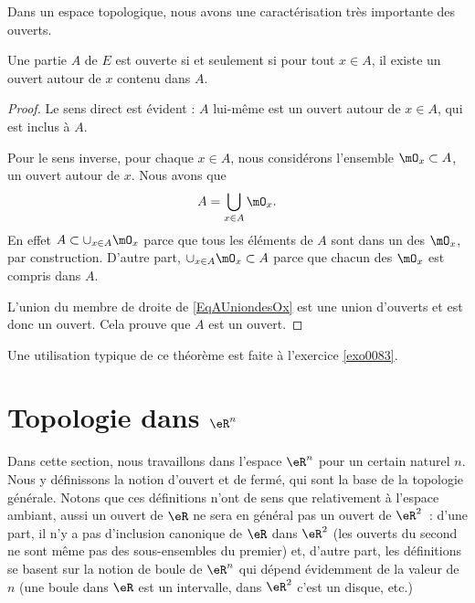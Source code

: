 Dans un espace topologique, nous avons une caractérisation très importante des ouverts.
\begin{theorem}		\label{ThoPartieOUvpartouv}
Une partie $A$ de $E$ est ouverte si et seulement si pour tout $x\in A$, il existe un ouvert autour de $x$ contenu dans $A$.
\end{theorem}

\begin{proof}
Le sens direct est évident : $A$ lui-même est un ouvert autour de $x\in A$, qui est inclus à $A$.

Pour le sens inverse, pour chaque $x\in A$, nous considérons l'ensemble $\mO_x\subset A$, un ouvert autour de $x$. Nous avons que
\begin{equation}	\label{EqAUniondesOx}
	A=\bigcup_{x\in A}\mO_x.
\end{equation}
En effet $A\subset\cup_{x\in A}\mO_x$ parce que tous les éléments de $A$ sont dans un des $\mO_x$, par construction. D'autre part, $\cup_{x\in A}\mO_x\subset A$ parce que chacun des $\mO_x$ est compris dans $A$.

L'union du membre de droite de \eqref{EqAUniondesOx} est une union d'ouverts et est donc un ouvert. Cela prouve que $A$ est un ouvert.

\end{proof}

Une utilisation typique de ce théorème est faite à l'exercice \ref{exo0083}.

%
   \section{Topologie dans \texorpdfstring{$\eR^n$}{Rn}}
%



Dans cette section, nous travaillons dans l'espace $\eR^n$ pour un certain naturel $n$. Nous y définissons la notion d'ouvert et de fermé, qui sont la base de la topologie générale. Notons que ces définitions n'ont de sens que relativement à l'espace ambiant, aussi un ouvert de $\eR$ ne sera en général pas un ouvert de $\eR^2$~: d'une part, il n'y a pas d'inclusion canonique de $\eR$ dans $\eR^2$ (les ouverts du second ne sont même pas des sous-ensembles du premier) et, d'autre part, les définitions se basent sur la notion de boule de $\eR^n$ qui dépend évidemment de la valeur de $n$ (une boule dans $\eR$ est un intervalle, dans $\eR^2$ c'est un disque, etc.)

